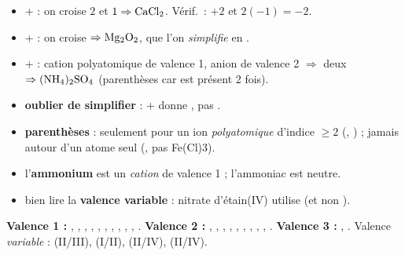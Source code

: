 \documentclass[11pt,a4paper]{article}
\begin{document}
\begin{exemplebox}
\begin{itemize}[leftmargin=1.5em,topsep=2pt,itemsep=2pt]
  \item {} +  : on croise $2$ et $1 \Rightarrow \ce{CaCl2}$. Vérif.\ : $+2$ et $2(-1)=-2$.
  \item {} +  : on croise $\Rightarrow \ce{Mg2O2}$, que l'on \emph{simplifie} en .
  \item {} +  : cation polyatomique de valence 1, anion de valence 2 $\Rightarrow$
        deux  $\Rightarrow \ce{(NH4)2SO4}$ (parenthèses car  est présent 2 fois).
\end{itemize}
\end{exemplebox}

\begin{piege}
\begin{itemize}[leftmargin=1.4em,topsep=2pt,itemsep=1pt]
  \item \textbf{oublier de simplifier} : + donne , pas \og{}\fg{}.
  \item \textbf{parenthèses} : seulement pour un ion \emph{polyatomique} d'indice $\geq 2$
        (, ) ; jamais autour d'un atome seul (, pas \og Fe(Cl)3\fg{}).
  \item l'\textbf{ammonium}  est un \emph{cation} de valence 1 ; l'ammoniac  est neutre.
  \item bien lire la \textbf{valence variable} : nitrate d'étain(IV) utilise  (et non ).
\end{itemize}
\end{piege}

\begin{remarque}
\textbf{Valence 1 :} , , , , , , , ,
, , . \quad
\textbf{Valence 2 :} , , , , , , ,
, , . \quad
\textbf{Valence 3 :} , . \quad
Valence \emph{variable} :  (II/III),  (I/II),  (II/IV),  (II/IV).
\end{remarque}
\end{document}
